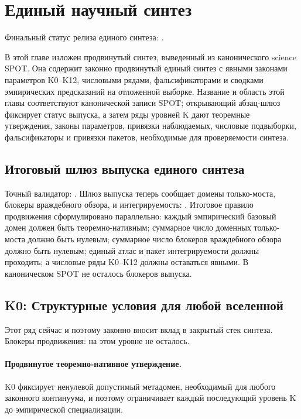 \section{Единый научный синтез}
\label{sec:oc-core-1-3-unified-synthesis}
Финальный статус релиза единого синтеза: .

В этой главе изложен продвинутый синтез, выведенный из канонического science SPOT. Она содержит законно продвинутый единый синтез с явными законами параметров K0--K12, числовыми рядами, фальсификаторами и сводками эмпирических предсказаний на отложенной выборке.
Название и область этой главы соответствуют канонической записи SPOT; открывающий абзац-шлюз фиксирует статус выпуска, а затем ряды уровней K дают теоремные утверждения, законы параметров, привязки наблюдаемых, числовые подвыборки, фальсификаторы и привязки пакетов, необходимые для проверяемости синтеза.

\subsection{Итоговый шлюз выпуска единого синтеза}
Точный валидатор: .
Шлюз выпуска теперь сообщает  домены только-моста,  блокеры враждебного обзора, и интегрируемость: .
Итоговое правило продвижения сформулировано параллельно: каждый эмпирический базовый домен должен быть теоремно-нативным; суммарное число доменных только-моста должно быть нулевым; суммарное число блокеров враждебного обзора должно быть нулевым; единый атлас и пакет интегрируемости должны проходить; а числовые ряды K0--K12 должны оставаться явными.
В каноническом SPOT не осталось блокеров выпуска.

\subsection{K0: Структурные условия для любой вселенной}
\label{sec:oc-core-1-3-synthesis-k0}
Этот ряд сейчас  и поэтому законно вносит вклад в закрытый стек синтеза.
Блокеры продвижения: на этом уровне не осталось.

\paragraph{Продвинутое теоремно-нативное утверждение.}
K0 фиксирует ненулевой допустимый метадомен, необходимый для любого законного континуума, и поэтому ограничивает каждый последующий уровень K до эмпирической специализации.

